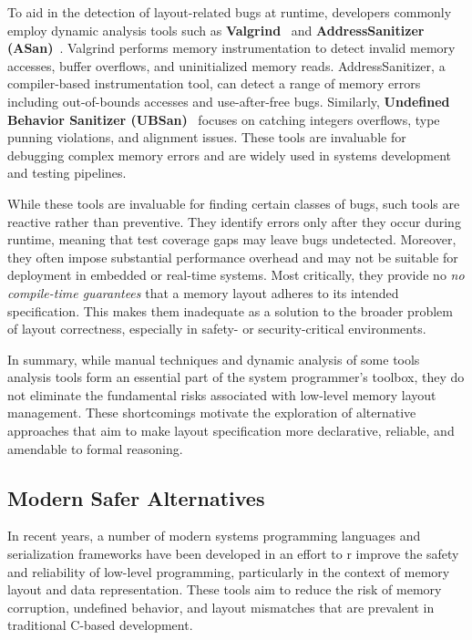 \documentclass[12pt]{article}
\begin{document}
To aid in the detection of layout-related bugs at runtime, developers commonly employ
dynamic analysis tools such as \textbf{Valgrind}~\autocite{valgrind} and 
\textbf{AddressSanitizer (ASan)}~\autocite{asan}. Valgrind
performs memory instrumentation to detect invalid memory accesses, buffer
overflows, and uninitialized memory reads. AddressSanitizer, a compiler-based
instrumentation tool, can detect a range of memory errors 
including out-of-bounds accesses and use-after-free bugs. Similarly, 
\textbf{Undefined Behavior Sanitizer (UBSan)}~\autocite{ubsan} focuses on catching integers
overflows, type punning violations, and alignment issues. These tools are
invaluable for debugging complex memory errors and are widely used in systems
development and testing pipelines.

While these tools are invaluable for finding certain classes of bugs,
such tools are reactive rather than preventive. They
identify errors only after they occur during runtime, meaning that test coverage
gaps may leave bugs undetected. Moreover, they often impose substantial
performance overhead and may not be suitable for deployment in embedded
or real-time systems. Most critically, they provide no \textit{no compile-time
guarantees} that a memory layout adheres to its intended specification. This
makes them inadequate as a solution to the broader problem of layout correctness,
especially in safety- or security-critical environments.

In summary, while manual techniques and dynamic analysis of some tools
analysis tools form an essential part of the system programmer's toolbox,
they do not eliminate the fundamental risks associated with low-level memory
layout management. These shortcomings motivate the exploration of alternative
approaches that aim to make layout specification more declarative, 
reliable, and amendable to formal reasoning.

\subsection{Modern Safer Alternatives}
In recent years, a number of modern systems programming languages and
serialization frameworks have been developed in an effort to r improve
the safety and reliability of low-level programming, particularly in
the context of memory layout and data representation. These tools aim
to reduce the risk of memory corruption, undefined behavior, and layout 
mismatches that are prevalent in traditional C-based development.
\end{document}
